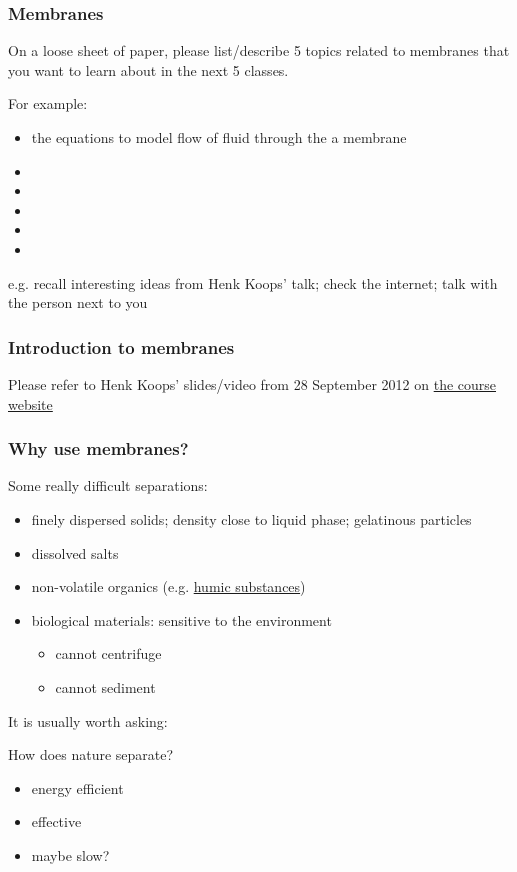 \begin{frame}\frametitle{Membranes}
	On a loose sheet of paper, please list/describe 5 topics related to membranes that you want to learn about in the next 5 classes.
	
	\vspace{12pt}
	For example:
	\begin{itemize}
		\item	the equations to model flow of fluid through the a membrane
		\item	
		\item	
		\item	
		\item	
		\item	
	\end{itemize}
	
	\vspace{12pt}
	e.g. recall interesting ideas from Henk Koops' talk; check the internet; talk with the person next to you
\end{frame}

\begin{frame}\frametitle{Introduction to membranes}
	Please refer to Henk Koops' slides/video from 28 September 2012 on \href{http://learnche.mcmaster.ca/4M3/Membranes,_dialysis,_reverse_osmosis,_filters_and_bioseparations_-_2012}{the course website}
\end{frame}

\begin{frame}\frametitle{Why use membranes?}
	Some really difficult separations:
	\begin{itemize}
		\item	finely dispersed solids; density close to liquid phase; gelatinous particles
		\item	dissolved salts
		\item	non-volatile organics (e.g. \href{http://en.wikipedia.org/wiki/Humic_acid}{humic substances})
		\item	biological materials: sensitive to the environment
			\begin{itemize}
				\item	cannot centrifuge 
				\item	cannot sediment
			\end{itemize}
	\end{itemize}
	
	\vspace{12pt}
	\begin{exampleblock}{It is usually worth asking:}
		\begin{center}
			How does nature separate?
		\end{center}
		\scriptsize
		\begin{itemize}
			\item	energy efficient
			\item	effective
			\item	maybe slow?
		\end{itemize}
	\end{exampleblock}		
\end{frame}

